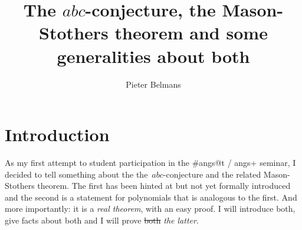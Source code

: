 \documentclass[11pt, a4paper, openany, oneside, article]{memoir}
\newif\ifblog
\newif\iftex
\theoremstyle{definition}
\begin{document}
\title{The $abc$-conjecture, the Mason-Stothers theorem and some generalities about both}
\author{Pieter Belmans}
\maketitle

\tableofcontents*

\clearpage


\section*{Introduction}

As my first attempt to student participation in the {\iftex\#\fi\ifblog#\fi}angs@t / angs+ seminar, I decided to tell something about the the~$abc$\nobreakdash-conjecture and the related Mason-Stothers theorem. The first has been hinted at but not yet formally introduced and the second is a statement for polynomials that is analogous to the first. And more importantly: it is a \emph{real theorem}, with an easy proof. I will introduce both, give facts about both and I will prove \sout{both} \emph{the latter}.

\iftex
The outline: in Section~\ref{section:abc} I will first give the formal statement of the $abc$-conjecture, it is already given online in \href{http://www.noncommutative.org/index.php/the-abc-conjecture.html}{the post of the same name} but we haven't seen it yet in the seminar. For personal reference I'll repeat this, together with some generalities about it. To end the section I discuss some consequences.
\fi
\ifblog
The outline: in this first post I will first give the formal statement of the $abc$-conjecture, it is already given online in \href{http://www.noncommutative.org/index.php/the-abc-conjecture.html}{the post of the same name} but we haven't seen it yet in the seminar. For personal reference I'll repeat this, together with some generalities about it. To end the section I discuss some consequences.
\fi

\iftex
Then in Section~\ref{section:mason-stothers} I will talk about the analogy for polynomials, resulting in the Mason-Stothers theorem. Afterwards I'll discuss the history of both the Mason-Stothers theorem and the~$abc$\nobreakdash-conjecture.
\fi
\ifblog
In the second post I will talk about the analogy for polynomials, resulting in the Mason-Stothers theorem. Afterwards I'll discuss the history of both the Mason-Stothers theorem and the~$abc$\nobreakdash-conjecture.
\fi
\end{document}
